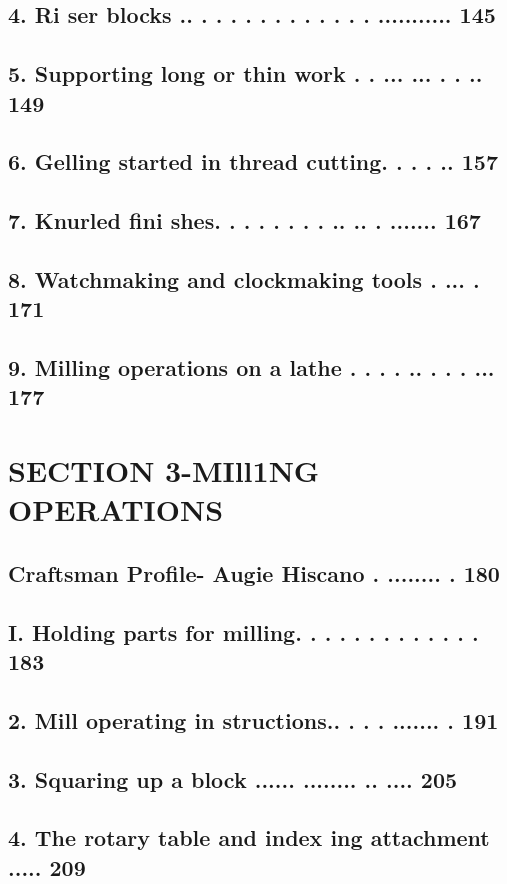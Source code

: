 \section{4. Ri ser blocks .. . . . . . . . . . . . . ........... 145}
\section{5. Supporting long or thin work . . ... ... . . .. 149}
\section{6. Gelling started in thread cutting. . . . .. 157}
\section{7. Knurled fini shes. . . . . . . . .. .. . ....... 167}
\section{8. Watchmaking and clockmaking tools . ... . 171}
\section{9. Milling operations on a lathe . . . . .. . . . ... 177}

\chapter{SECTION 3-MIll1NG OPERATIONS}
\section{Craftsman Profile- Augie Hiscano . ........ . 180}
\section{I. Holding parts for milling. . . . . . . . . . . . . 183}
\section{2. Mill operating in structions.. . . . ....... . 191}
\section{3. Squaring up a block ...... ........ .. .... 205}
\section{4. The rotary table and index ing attachment ..... 209}

